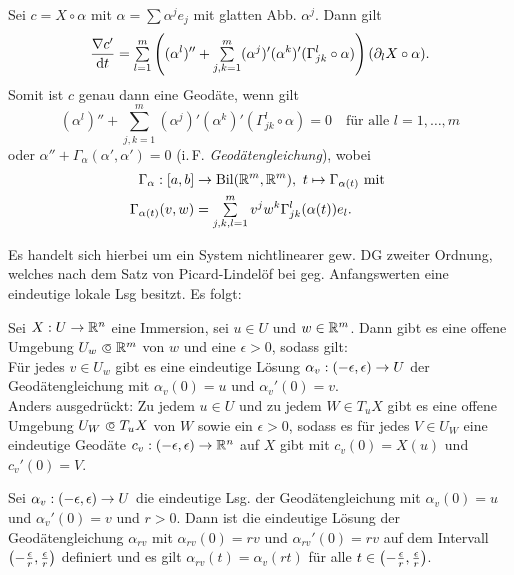 \documentclass{cheat-sheet}
\DeclareMathOperator{\Bil}{Bil} %
\begin{document}
\begin{bem}
  Sei $c = X \circ \alpha$ mit $\alpha = \sum \alpha^j e_j$ mit glatten Abb. $\alpha^j$. Dann gilt
  \[ \frac{\nabla c'}{\d t} = \sum_{l=1}^m \left( (\alpha^l)'' + \sum_{j,k=1}^m (\alpha^j)' (\alpha^k)' (\Gamma_{jk}^l \circ \alpha) \right) (\partial_l X \circ \alpha). \]
  Somit ist $c$ genau dann eine Geodäte, wenn gilt
  \[ (\alpha^l)'' + \sum_{j,k=1}^m (\alpha^j)' (\alpha^k)' (\Gamma_{jk}^l \circ \alpha) = 0 \quad \text{für alle $l = 1, \ldots, m$} \]
  oder $\alpha'' + \Gamma_{\alpha}(\alpha', \alpha') = 0$ (i.\,F. \emph{Geodätengleichung}), wobei
  \begin{align*}
    \Gamma_{\alpha} : \cinterval{a}{b} &\to \Bil(\R^m, \R^m), \  t \mapsto \Gamma_{\alpha(t)} \text{ mit }\\
    \Gamma_{\alpha(t)}(v, w) &= \sum_{j,k,l=1}^m v^j w^k \Gamma_{jk}^l (\alpha(t)) e_l.
  \end{align*}
\end{bem}

\begin{bem}
  Es handelt sich hierbei um ein System nichtlinearer gew. DG zweiter Ordnung, welches nach dem Satz von Picard-Lindelöf bei geg. Anfangswerten eine eindeutige lokale Lsg besitzt. Es folgt:
\end{bem}

\begin{satz}
  Sei $X : U \to \mathbb{R}^n$ eine Immersion, sei $u \in U$ und $w \in \mathbb{R}^m$. Dann gibt es eine offene Umgebung $U_w \opn \R^m$ von $w$ und eine $\epsilon > 0$, sodass gilt: \\
  Für jedes $v \in U_w$ gibt es eine eindeutige Lösung $\alpha_v : \left( -\epsilon, \epsilon \right) \to U$ der Geodätengleichung mit $\alpha_v(0) = u$ und $\alpha_v'(0) = v$. \\
  Anders ausgedrückt: Zu jedem $u \in U$ und zu jedem $W \in T_u X$ gibt es eine offene Umgebung $U_W \opn T_u X$ von $W$ sowie ein $\epsilon > 0$, sodass es für jedes $V \in U_W$ eine eindeutige Geodäte $c_v : \left( -\epsilon, \epsilon \right) \to \mathbb{R}^n$ auf $X$ gibt mit $c_v(0) = X(u)$ und $c_v'(0) = V$.
\end{satz}

\begin{satz}
  Sei $\alpha_v : \left( -\epsilon, \epsilon \right) \to U$ die eindeutige Lsg. der Geodätengleichung mit $\alpha_v(0) = u$ und $\alpha_v'(0) = v$ und $r > 0$. Dann ist die eindeutige Lösung der Geodätengleichung $\alpha_{rv}$ mit $\alpha_{rv}(0) = rv$ und $\alpha_{rv}'(0) = rv$ auf dem Intervall $\left( -\tfrac{\epsilon}{r}, \tfrac{\epsilon}{r} \right)$ definiert und es gilt
  $\alpha_{rv}(t) = \alpha_v(rt)$ für alle $t \in \left( -\tfrac{\epsilon}{r}, \tfrac{\epsilon}{r} \right)$.
\end{satz}
\end{document}
